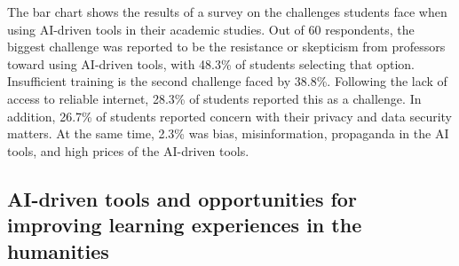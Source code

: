 
\begin{figure}[H]
	\centering
\end{figure}
The bar chart shows the results of a survey on the challenges students face when using AI-driven tools in their academic studies.
Out of 60 respondents, the biggest challenge was reported to be the resistance or skepticism from professors toward using AI-driven
tools, with 48.3\% of students selecting that option. Insufficient training is the second challenge faced by 38.8\%.
Following the lack of access to reliable internet, 28.3\% of students reported this as a challenge.
In addition, 26.7\% of students reported concern with their privacy and data security matters. At the same time,
2.3\% was bias, misinformation, propaganda in the AI tools, and high prices of the AI-driven tools.
\subsection{AI-driven tools and opportunities for improving learning experiences in the humanities }

